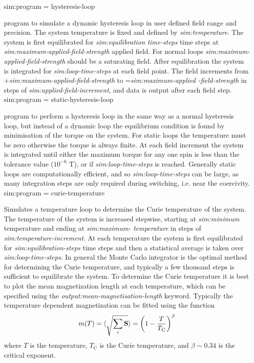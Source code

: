 {\zicf sim:program = hysteresis-loop} program to simulate a dynamic hysteresis loop in user defined field range and precision. The system temperature is fixed and defined by \textit{sim:temperature}. The system is first equilibrated for \textit{sim:equilibration time-steps} time steps at \textit{sim:maximum-applied-field-strength} applied field. For normal loops \textit{sim:maximum-applied-field-strength} should be a saturating field. After equilibration the system is integrated for \textit{sim:loop-time-steps} at each field point. The field increments from +\textit{sim:maximum-applied-field-strength} to =\textit{sim:maximum-applied -field-strength} in steps of \textit{sim:applied-field-increment}, and data is output after each field step.\\

{\zicf sim:program = static-hysteresis-loop} program to perform a hysteresis loop in the same way as a normal hysteresis loop, but instead of a dynamic loop the equilibrium condition is found by minimisation of the torque on the system. For static loops the temperature must be zero otherwise the torque is always finite. At each field increment the system is integrated until either the maximum torque for any one spin is less than the tolerance value ($10^{-6}$ T), or if \textit{sim:loop-time-steps} is reached. Generally static loops are computationally efficient, and so \textit{sim:loop-time-steps} can be large, as many integration steps are only required during switching, i.e. near the coercivity.\\

{\zicf sim:program = curie-temperature} Simulates a temperature loop to determine the Curie temperature of the system. The temperature of the system is increased stepwise, starting at \textit{sim:minimum} temperature and ending at \textit{sim:maximum- temperature} in steps of \textit{sim:temperature-increment}. At each temperature the system is first equilibrated for \textit{sim:equilibration-steps} time steps and then a statistical average is taken over \textit{sim:loop-time-steps}. In general the Monte Carlo integrator is the optimal method for determining the Curie temperature, and typically a few thousand steps is sufficient to equilibrate the system. To determine the Curie temperature it is best to plot the mean magnetization length at each temperature, which can be specified using the \textit{output:mean-magnetisation-length} keyword. Typically the temperature dependent magnetization can be fitted using the function
\begin{equation}
m(T) = \langle{\sqrt{\sum_i \mathbf{S}}}\rangle = \left(1 - \frac{T}{T_{\mathrm{C}}} \right)^{\beta}
\end{equation}
where $T$ is the temperature, $T_{\mathrm{C}}$ is the Curie temperature, and $\beta \sim 0.34$ is the critical exponent.\\

